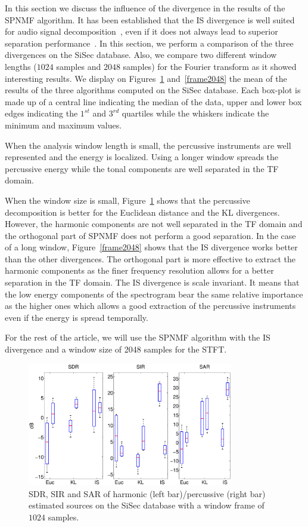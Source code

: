 In this section we discuss the influence of the divergence in the results of the SPNMF algorithm. It has been established that the IS divergence is well suited for audio signal decomposition~\cite{gray1980distortion}, even if it does not always lead to superior separation performance~\cite{canadas2014percussive}. In this section, we perform a comparison of the three divergences on the SiSec database. Also, we compare two different window lengths ($1024$ samples and $2048$ samples) for the Fourier transform as it showed interesting results. We display on Figures~\ref{frame1024} and~\ref{frame2048} the mean of the results of the three algorithms computed on the SiSec database. Each box-plot is made up of a central line indicating the median of the data, upper and lower box edges indicating the $1^{st}$ and $3^{rd}$ quartiles while the whiskers indicate the minimum and maximum values. 

When the analysis window length is small, the percussive instruments are well represented and the energy is localized. Using a longer window spreads the percussive energy while the tonal components are well separated in the TF domain.

When the window size is small, Figure~\ref{frame1024} shows that the percussive decomposition is better for the Euclidean distance and the KL divergences. However, the harmonic components are not well separated in the TF domain and the orthogonal part of SPNMF does not perform a good separation.  
In the case of a long window, Figure~\ref{frame2048} shows that the IS divergence works better than the other divergences. The orthogonal part is more effective to extract the harmonic components as the finer frequency resolution allows for a better separation in the TF domain. The IS divergence is scale invariant. It means that the low energy components of the spectrogram bear the same relative importance as the higher ones which allows a good extraction of the percussive instruments even if the energy is spread temporally.


For the rest of the article, we will use the SPNMF algorithm with the IS divergence and a window size of 2048 samples for the STFT.


\begin{figure}[t]

  \centering 
  \includegraphics[width=9cm]{fig/NewDictDivTest1024}
  \caption{\label{frame1024} SDR, SIR and SAR of harmonic (left bar)/percussive (right bar) estimated sources on the SiSec database with a window frame of $1024$ samples.}
  
\end{figure}


